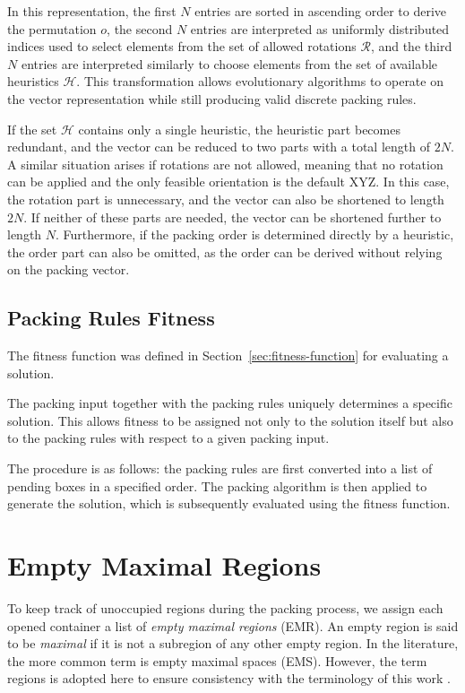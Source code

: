In this representation, the first $N$ entries are sorted in ascending order to derive the permutation $o$, 
the second $N$ entries are interpreted as uniformly distributed indices used to select elements from the set of allowed rotations $\mathcal{R}$, 
and the third $N$ entries are interpreted similarly to choose elements from the set of available heuristics $\mathcal{H}$. 
This transformation allows evolutionary algorithms to operate on the vector representation while still producing valid discrete packing rules.

If the set $\mathcal{H}$ contains only a single heuristic, the heuristic part becomes redundant, and the vector can be reduced to two parts with a total length of $2N$. 
A similar situation arises if rotations are not allowed, meaning that no rotation can be applied and the only feasible orientation is the default XYZ. 
In this case, the rotation part is unnecessary, and the vector can also be shortened to length $2N$. 
If neither of these parts are needed, the vector can be shortened further to length $N$. 
Furthermore, if the packing order is determined directly by a heuristic, the order part can also be omitted, as the order can be derived without relying on the packing vector.

\subsection{Packing Rules Fitness}
\label{sec:fitness-packing-rules}

The fitness function was defined in Section~\ref{sec:fitness-function} for evaluating a solution.

The packing input together with the packing rules uniquely determines a specific solution. 
This allows fitness to be assigned not only to the solution itself but also to the packing rules with respect to a given packing input. 

The procedure is as follows: the packing rules are first converted into a list of pending boxes in a specified order. The packing algorithm is then applied to generate the solution, which is subsequently evaluated using the fitness function.

\section{Empty Maximal Regions}

To keep track of unoccupied regions during the packing process, we assign each opened container a list of \emph{empty maximal regions} (EMR). 
An empty region is said to be \textit{maximal} if it is not a subregion of any other empty region. 
In the literature, the more common term is empty maximal spaces (EMS). However, the term regions is adopted here to ensure consistency with the terminology of this work \cite{lai1997, goncalves2013}.

